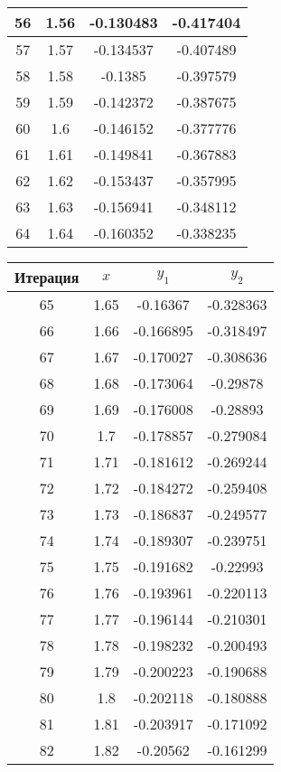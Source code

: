 \begin{center}
\begin{tabular}{|c|c|c|c|}
		\hline
		56 & 1.56 & -0.130483 & -0.417404 \\
		\hline
		57 & 1.57 & -0.134537 & -0.407489 \\
		\hline
		58 & 1.58 & -0.1385 & -0.397579 \\
		\hline
		59 & 1.59 & -0.142372 & -0.387675 \\
		\hline
		60 & 1.6 & -0.146152 & -0.377776 \\
		\hline
		61 & 1.61 & -0.149841 & -0.367883 \\
		\hline
		62 & 1.62 & -0.153437 & -0.357995 \\
		\hline
		63 & 1.63 & -0.156941 & -0.348112 \\
		\hline
		64 & 1.64 & -0.160352 & -0.338235 \\
		\hline
	\end{tabular}
\begin{tabular}{|c|c|c|c|}
		\hline
		Итерация & $ x $ & $ y_{1} $ & $ y_{2} $\\
		\hline
		65 & 1.65 & -0.16367 & -0.328363 \\
		\hline
		66 & 1.66 & -0.166895 & -0.318497 \\
		\hline
		67 & 1.67 & -0.170027 & -0.308636 \\
		\hline
		68 & 1.68 & -0.173064 & -0.29878 \\
		\hline
		69 & 1.69 & -0.176008 & -0.28893 \\
		\hline
		70 & 1.7 & -0.178857 & -0.279084 \\
		\hline
		71 & 1.71 & -0.181612 & -0.269244 \\
		\hline
		72 & 1.72 & -0.184272 & -0.259408 \\
		\hline
		73 & 1.73 & -0.186837 & -0.249577 \\
		\hline
		74 & 1.74 & -0.189307 & -0.239751 \\
		\hline
		75 & 1.75 & -0.191682 & -0.22993 \\
		\hline
		76 & 1.76 & -0.193961 & -0.220113 \\
		\hline
		77 & 1.77 & -0.196144 & -0.210301 \\
		\hline
		78 & 1.78 & -0.198232 & -0.200493 \\
		\hline
		79 & 1.79 & -0.200223 & -0.190688 \\
		\hline
		80 & 1.8 & -0.202118 & -0.180888 \\
		\hline
		81 & 1.81 & -0.203917 & -0.171092 \\
		\hline
		82 & 1.82 & -0.20562 & -0.161299 \\
		\hline

\end{tabular}
\end{center}
